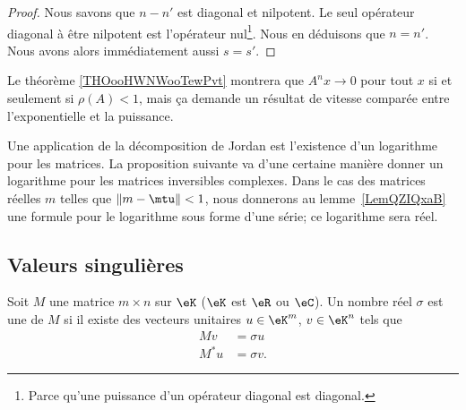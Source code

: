 \begin{proof}
	Nous savons que \( n-n'\) est diagonal et nilpotent. Le seul opérateur diagonal à être nilpotent est l'opérateur nul\footnote{Parce qu'une puissance d'un opérateur diagonal est diagonal.}. Nous en déduisons que \( n=n'\). Nous avons alors immédiatement aussi \( s=s'\).
\end{proof}

\begin{normaltext}
	Le théorème \ref{THOooHWNWooTewPvt} montrera que \( A^nx\to 0\) pour tout \( x\) si et seulement si \( \rho(A)<1\), mais ça demande un résultat de vitesse comparée entre l'exponentielle et la puissance.
\end{normaltext}

Une application de la décomposition de Jordan est l'existence d'un logarithme pour les matrices. La proposition suivante va d'une certaine manière donner un logarithme pour les matrices inversibles complexes. Dans le cas des matrices réelles \( m\) telles que \( \| m-\mtu \|<1\), nous donnerons au lemme~\ref{LemQZIQxaB} une formule pour le logarithme sous forme d'une série; ce logarithme sera réel.

\subsection{Valeurs singulières}

\begin{definition}      \label{DEFooZSCYooQnBzix}
	Soit \( M\) une matrice \( m\times n\) sur \( \eK\) (\( \eK\) est \( \eR\) ou \( \eC\)). Un nombre réel \( \sigma\) est une  de \( M\) si il existe des vecteurs unitaires \( u\in \eK^m\), \( v\in \eK^n\) tels que
	\begin{subequations}
		\begin{align}
			Mv   & =\sigma u  \\
			M^*u & =\sigma v.
		\end{align}
	\end{subequations}
\end{definition}

